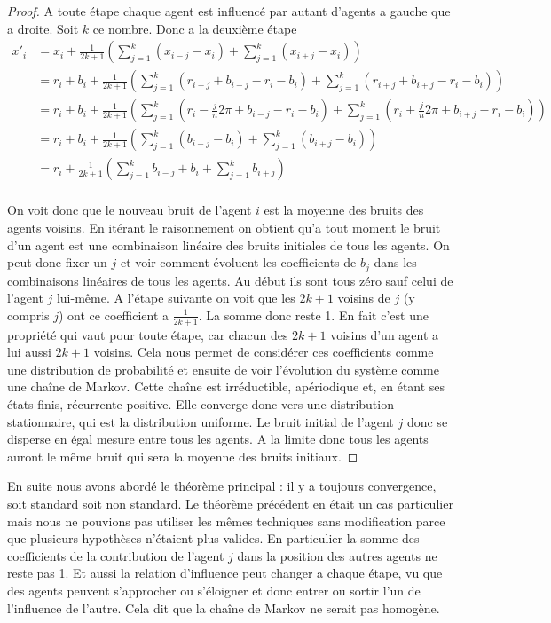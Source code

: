 \documentclass[a4paper,10pt]{article}
\begin{document}
\begin{proof}
A toute étape chaque agent est influencé par autant d'agents a gauche que a droite. Soit $k$ ce nombre. Donc a la deuxième étape
\begin{equation*}
\begin{split}
x'_i &= x_i + \frac{1}{2k+1} \left( \sum_{j=1}^k (x_{i-j} - x_i) + \sum_{j=1}^k (x_{i+j} - x_i) \right) \\
     &= r_i + b_i + \frac{1}{2k+1} \left( \sum_{j=1}^k (r_{i-j} + b_{i-j} - r_i - b_i) + \sum_{j=1}^k (r_{i+j} + b_{i+j} - r_i - b_i) \right) \\
     &= r_i + b_i + \frac{1}{2k+1} \left( \sum_{j=1}^k (r_i - \frac{j}{n}2 \pi + b_{i-j} - r_i - b_i) + \sum_{j=1}^k (r_i + \frac{j}{n}2 \pi + b_{i+j} - r_i - b_i) \right) \\
     &= r_i + b_i + \frac{1}{2k+1} \left( \sum_{j=1}^k (b_{i-j} - b_i) + \sum_{j=1}^k (b_{i+j} - b_i) \right) \\
     &= r_i + \frac{1}{2k+1} \left( \sum_{j=1}^k b_{i-j} + b_i + \sum_{j=1}^k b_{i+j} \right) \\
\end{split}
\end{equation*}

On voit donc que le nouveau bruit de l'agent $i$ est la moyenne des bruits des agents voisins. En itérant le raisonnement on obtient qu'a tout moment le bruit d'un agent est une combinaison linéaire des bruits initiales de tous les agents. On peut donc fixer un $j$ et voir comment évoluent les coefficients de $b_j$ dans les combinaisons linéaires de tous les agents. Au début ils sont tous zéro sauf celui de l'agent $j$ lui-même. A l’étape suivante on voit que les $2k+1$ voisins de $j$ (y compris $j$) ont ce coefficient a $\frac{1}{2k+1}$. La somme donc reste 1. En fait c'est une propriété qui vaut pour toute étape, car chacun des $2k+1$ voisins d'un agent a lui aussi $2k+1$ voisins. Cela nous permet de considérer ces coefficients comme une distribution de probabilité et ensuite de voir l’évolution du système comme une chaîne de Markov. Cette chaîne est irréductible, apériodique et, en étant ses états finis, récurrente positive. Elle converge donc vers une distribution stationnaire, qui est la distribution uniforme. Le bruit initial de l'agent $j$ donc se disperse en égal mesure entre tous les agents. A la limite donc tous les agents auront le même bruit qui sera la moyenne des bruits initiaux.
\end{proof}

En suite nous avons abordé le théorème principal : il y a toujours convergence, soit standard soit non standard. Le théorème précédent en était un cas particulier mais nous ne pouvions pas utiliser les mêmes techniques sans modification parce que plusieurs hypothèses n’étaient plus valides. En particulier la somme des coefficients de la contribution de l'agent $j$ dans la position des autres agents ne reste pas 1. Et aussi la relation d'influence peut changer a chaque étape, vu que des agents peuvent s'approcher ou s’éloigner et donc entrer ou sortir l'un de l'influence de l'autre. Cela dit que la chaîne de Markov ne serait pas homogène.
\end{document}
